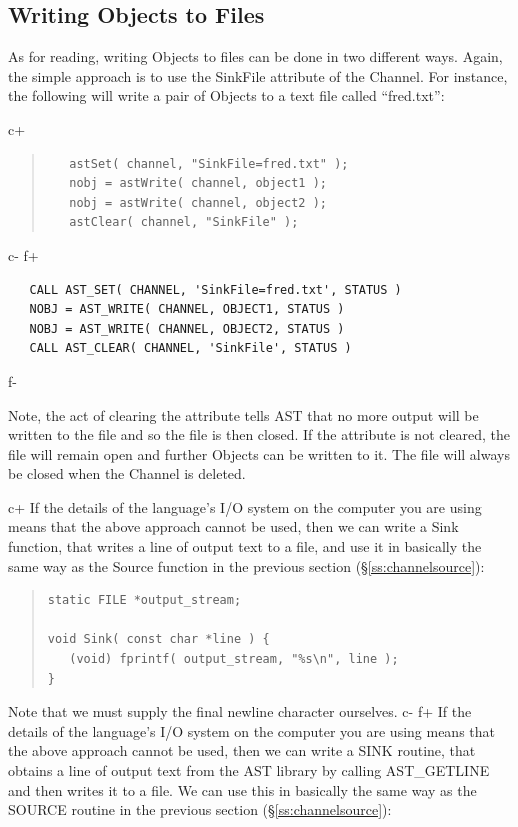 \documentclass[twoside,11pt]{article}
\newcommand{\secref}[1]{\S\ref{#1}}
\newcommand{\secref}[1]{\ref{#1}}
\begin{document}
\subsection{\label{ss:channelsink}Writing Objects to Files}

As for reading, writing Objects to files can be done in two different ways.
Again, the simple approach is to use the SinkFile attribute of the Channel.
For instance, the following will write a pair of Objects to a text file
called ``fred.txt'':

c+
\begin{quote}
\small
\begin{verbatim}
   astSet( channel, "SinkFile=fred.txt" );
   nobj = astWrite( channel, object1 );
   nobj = astWrite( channel, object2 );
   astClear( channel, "SinkFile" );
\end{verbatim}
\normalsize
\end{quote}
c-
f+
\small
\begin{verbatim}
   CALL AST_SET( CHANNEL, 'SinkFile=fred.txt', STATUS )
   NOBJ = AST_WRITE( CHANNEL, OBJECT1, STATUS )
   NOBJ = AST_WRITE( CHANNEL, OBJECT2, STATUS )
   CALL AST_CLEAR( CHANNEL, 'SinkFile', STATUS )
\end{verbatim}
\normalsize
f-

Note, the act of clearing the attribute tells AST that no more output
will be written to the file and so the file is then closed. If the
attribute is not cleared, the file will remain open and further Objects
can be written to it. The file will always be closed when the Channel is
deleted.

c+
If the details of the language's I/O system on the computer you are using
means that the above approach cannot be used, then we can write a Sink function,
that writes a line of output text to a file, and use it in basically the same
way as the Source function in the previous section (\secref{ss:channelsource}):

\begin{quote}
\small
\begin{verbatim}
static FILE *output_stream;

void Sink( const char *line ) {
   (void) fprintf( output_stream, "%s\n", line );
}
\end{verbatim}
\normalsize
\end{quote}

Note that we must supply the final newline character ourselves.
c-
f+
If the details of the language's I/O system on the computer you are using
means that the above approach cannot be used, then we can write a SINK routine,
that obtains a line of output text from the AST library by calling AST\_GETLINE
and then writes it to a file. We can use this in basically the same way as
the SOURCE routine in the previous section (\secref{ss:channelsource}):
\end{document}
